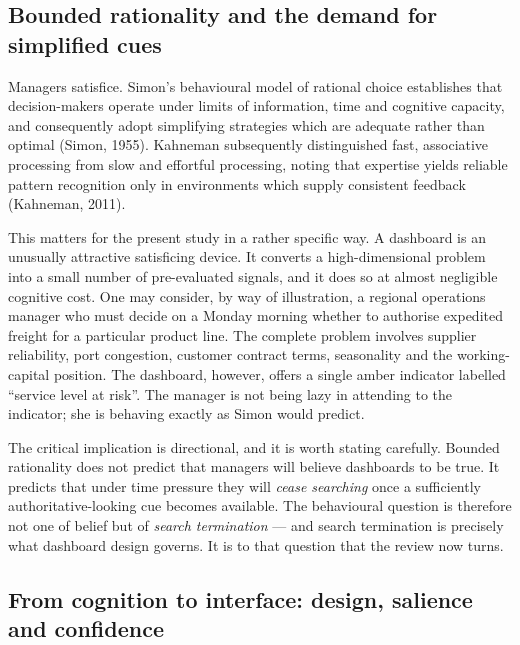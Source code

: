 \documentclass[11pt,a4paper]{article}
\numberwithin{figure}{section}
\numberwithin{table}{section}
\newcommand{\ct}[1]{\textcolor{citeblue}{#1}}          %
\begin{document}
\subsection{Bounded rationality and the demand for simplified cues}

Managers satisfice. Simon's behavioural model of rational choice establishes that decision-makers
operate under limits of information, time and cognitive capacity, and consequently adopt
simplifying strategies which are adequate rather than optimal \ct{(Simon, 1955)}. Kahneman
subsequently distinguished fast, associative processing from slow and effortful processing, noting
that expertise yields reliable pattern recognition only in environments which supply consistent
feedback \ct{(Kahneman, 2011)}.

This matters for the present study in a rather specific way. A dashboard is an unusually
attractive satisficing device. It converts a high-dimensional problem into a small number of
pre-evaluated signals, and it does so at almost negligible cognitive cost. One may consider, by way
of illustration, a regional operations manager who must decide on a Monday morning whether to
authorise expedited freight for a particular product line. The complete problem involves supplier
reliability, port congestion, customer contract terms, seasonality and the working-capital
position. The dashboard, however, offers a single amber indicator labelled ``service level at
risk''. The manager is not being lazy in attending to the indicator; she is behaving exactly as
Simon would predict.

The critical implication is directional, and it is worth stating carefully. Bounded rationality
does not predict that managers will believe dashboards to be true. It predicts that under time
pressure they will \emph{cease searching} once a sufficiently authoritative-looking cue becomes
available. The behavioural question is therefore not one of belief but of \emph{search
termination} --- and search termination is precisely what dashboard design governs. It is to that
question that the review now turns.

\subsection{From cognition to interface: design, salience and confidence}
\end{document}
